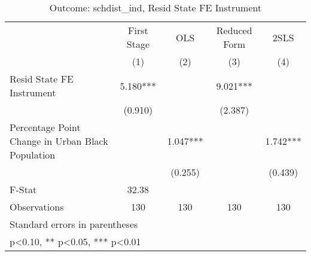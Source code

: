 \begin{table}[htbp]\centering
\def\sym#1{\ifmmode^{#1}\else\(^{#1}\)\fi}
\caption{Outcome: schdist\_ind, Resid State FE Instrument}
\begin{tabular}{l*{4}{c}}
\toprule
                    & First Stage   &         OLS   &Reduced Form   &        2SLS   \\
                    &\multicolumn{1}{c}{(1)}   &\multicolumn{1}{c}{(2)}   &\multicolumn{1}{c}{(3)}   &\multicolumn{1}{c}{(4)}   \\
\midrule
Resid State FE Instrument&       5.180***&               &       9.021***&               \\
                    &     (0.910)   &               &     (2.387)   &               \\
\addlinespace
Percentage Point Change in Urban Black Population&               &       1.047***&               &       1.742***\\
                    &               &     (0.255)   &               &     (0.439)   \\
\midrule
F-Stat              &       32.38   &               &               &               \\
Observations        &         130   &         130   &         130   &         130   \\
\bottomrule
\multicolumn{5}{l}{\footnotesize Standard errors in parentheses}\\
\multicolumn{5}{l}{\footnotesize * p<0.10, ** p<0.05, *** p<0.01}\\
\end{tabular}
\end{table}
